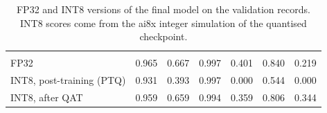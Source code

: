 \begin{table}[H]
  \centering
  \caption{FP32 and INT8 versions of the final model on the validation records. INT8 scores come from the ai8x integer simulation of the quantised checkpoint.}
  \label{tab:quantization-val}
  \begin{tabularx}{\linewidth}{lRRRRRR}
     &  &  &  &  &  &  \\
    FP32 & 0.965 & 0.667 & 0.997 & 0.401 & 0.840 & 0.219 \\
    INT8, post-training (PTQ) & 0.931 & 0.393 & 0.997 & 0.000 & 0.544 & 0.000 \\
    INT8, after QAT & 0.959 & 0.659 & 0.994 & 0.359 & 0.806 & 0.344 \\
    \bottomrule
  \end{tabularx}
\end{table}
